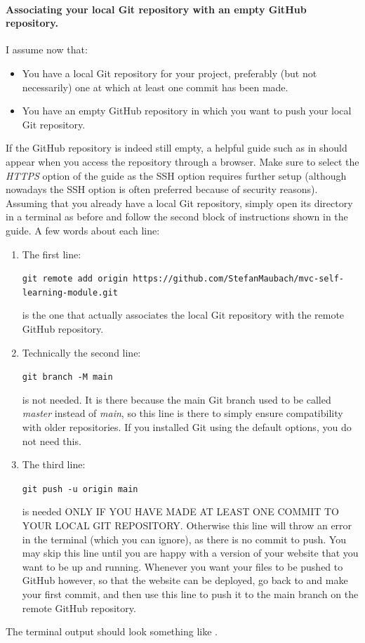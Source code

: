 \documentclass[a4paper,10pt]{article}
\begin{document}
\paragraph{Associating your local Git repository with an empty GitHub repository.} I assume now that:
\begin{itemize}
    \item You have a local Git repository for your project, preferably (but not necessarily) one at which at least one commit has been made.
    \item You have an empty GitHub repository in which you want to push your local Git repository.
\end{itemize}
If the GitHub repository is indeed still empty, a helpful guide such as in  should appear when you access the repository through a browser. Make sure to select the \emph{HTTPS} option of the guide as the SSH option requires further setup (although nowadays the SSH option is often preferred because of security reasons). Assuming that you already have a local Git repository, simply open its directory in a terminal as before and follow the second block of instructions shown in the guide. A few words about each line:
\begin{enumerate}
    \item The first line:

    \texttt{git remote add origin https://github.com/StefanMaubach/mvc-self-learning-module.git}
    
    is the one that actually associates the local Git repository with the remote GitHub repository.
    
    \item Technically the second line:
    
    \texttt{git branch -M main}
    
    is not needed. It is there because the main Git branch used to be called \emph{master} instead of \emph{main}, so this line is there to simply ensure compatibility with older repositories. If you installed Git using the default options, you do not need this.

    \item The third line:

    \texttt{git push -u origin main}

    is needed ONLY IF YOU HAVE MADE AT LEAST ONE COMMIT TO YOUR LOCAL GIT REPOSITORY. Otherwise this line will throw an error in the terminal (which you can ignore), as there is no commit to push. You may skip this line until you are happy with a version of your website that you want to be up and running. Whenever you want your files to be pushed to GitHub however, so that the website can be deployed, go back to  and make your first commit, and then use this line to push it to the main branch on the remote GitHub repository.
\end{enumerate}
The terminal output should look something like .
\end{document}
